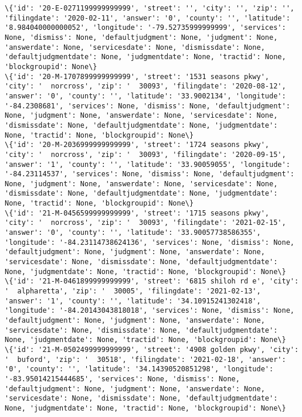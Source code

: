\documentclass[11pt]{article}
\begin{document}
\begin{Verbatim}[commandchars=\\\{\}]
\{'id': '20-E-0271199999999999', 'street': '', 'city': '', 'zip': '', 'filingdate': '2020-02-11', 'answer': '0', 'county': '', 'latitude': '8.984040000000052', 'longitude': '-79.52735999999999', 'services': None, 'dismiss': None, 'defaultjudgment': None, 'judgment': None, 'answerdate': None, 'servicesdate': None, 'dismissdate': None, 'defaultjudgmentdate': None, 'judgmentdate': None, 'tractid': None, 'blockgroupid': None\}
\{'id': '20-M-1707899999999999', 'street': '1531 seasons pkwy', 'city': '  norcross', 'zip': '  30093', 'filingdate': '2020-08-12', 'answer': '0', 'county': '', 'latitude': '33.9002134', 'longitude': '-84.2308681', 'services': None, 'dismiss': None, 'defaultjudgment': None, 'judgment': None, 'answerdate': None, 'servicesdate': None, 'dismissdate': None, 'defaultjudgmentdate': None, 'judgmentdate': None, 'tractid': None, 'blockgroupid': None\}
\{'id': '20-M-2036999999999999', 'street': '1724 seasons pkwy', 'city': '  norcross', 'zip': '  30093', 'filingdate': '2020-09-15', 'answer': '1', 'county': '', 'latitude': '33.90059055', 'longitude': '-84.23114537', 'services': None, 'dismiss': None, 'defaultjudgment': None, 'judgment': None, 'answerdate': None, 'servicesdate': None, 'dismissdate': None, 'defaultjudgmentdate': None, 'judgmentdate': None, 'tractid': None, 'blockgroupid': None\}
\{'id': '21-M-0456599999999999', 'street': '1715 seasons pkwy', 'city': '  norcross', 'zip': '  30093', 'filingdate': '2021-02-15', 'answer': '0', 'county': '', 'latitude': '33.90057738586355', 'longitude': '-84.23114738624136', 'services': None, 'dismiss': None, 'defaultjudgment': None, 'judgment': None, 'answerdate': None, 'servicesdate': None, 'dismissdate': None, 'defaultjudgmentdate': None, 'judgmentdate': None, 'tractid': None, 'blockgroupid': None\}
\{'id': '21-M-0461899999999999', 'street': '6815 shiloh rd e', 'city': '  alpharetta', 'zip': '  30005', 'filingdate': '2021-02-13', 'answer': '1', 'county': '', 'latitude': '34.10915241302418', 'longitude': '-84.20143043818018', 'services': None, 'dismiss': None, 'defaultjudgment': None, 'judgment': None, 'answerdate': None, 'servicesdate': None, 'dismissdate': None, 'defaultjudgmentdate': None, 'judgmentdate': None, 'tractid': None, 'blockgroupid': None\}
\{'id': '21-M-0502499999999999', 'street': '4908 golden pkwy', 'city': '  buford', 'zip': '  30518', 'filingdate': '2021-02-18', 'answer': '0', 'county': '', 'latitude': '34.14390520851298', 'longitude': '-83.95014215444685', 'services': None, 'dismiss': None, 'defaultjudgment': None, 'judgment': None, 'answerdate': None, 'servicesdate': None, 'dismissdate': None, 'defaultjudgmentdate': None, 'judgmentdate': None, 'tractid': None, 'blockgroupid': None\}

\end{Verbatim}
\end{document}
